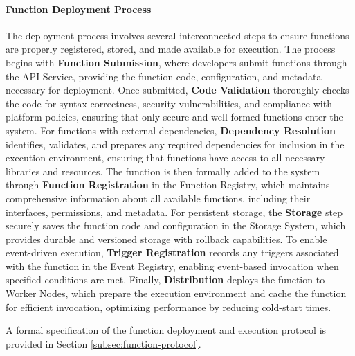 \documentclass{article}
\begin{document}
\paragraph{Function Deployment Process}
The deployment process involves several interconnected steps to ensure functions are properly registered, stored, and made available for execution. The process begins with \textbf{Function Submission}, where developers submit functions through the API Service, providing the function code, configuration, and metadata necessary for deployment. Once submitted, \textbf{Code Validation} thoroughly checks the code for syntax correctness, security vulnerabilities, and compliance with platform policies, ensuring that only secure and well-formed functions enter the system. For functions with external dependencies, \textbf{Dependency Resolution} identifies, validates, and prepares any required dependencies for inclusion in the execution environment, ensuring that functions have access to all necessary libraries and resources. The function is then formally added to the system through \textbf{Function Registration} in the Function Registry, which maintains comprehensive information about all available functions, including their interfaces, permissions, and metadata. For persistent storage, the \textbf{Storage} step securely saves the function code and configuration in the Storage System, which provides durable and versioned storage with rollback capabilities. To enable event-driven execution, \textbf{Trigger Registration} records any triggers associated with the function in the Event Registry, enabling event-based invocation when specified conditions are met. Finally, \textbf{Distribution} deploys the function to Worker Nodes, which prepare the execution environment and cache the function for efficient invocation, optimizing performance by reducing cold-start times.

A formal specification of the function deployment and execution protocol is provided in Section \ref{subsec:function-protocol}.




\end{document}
